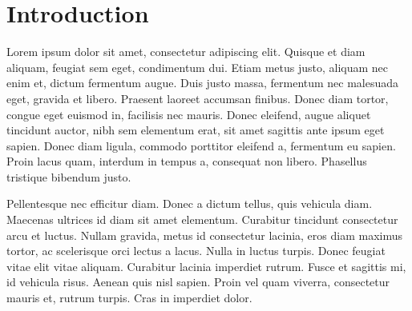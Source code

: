 %
%
%

\section{\label{sec:Introduction}Introduction}

Lorem ipsum dolor sit amet, consectetur adipiscing elit. Quisque et diam aliquam, feugiat sem eget, condimentum dui.
Etiam metus justo, aliquam nec enim et, dictum fermentum augue. Duis justo massa, fermentum nec malesuada eget, gravida
et libero. Praesent laoreet accumsan finibus. Donec diam tortor, congue eget euismod in, facilisis nec mauris. Donec
eleifend, augue aliquet tincidunt auctor, nibh sem elementum erat, sit amet sagittis ante ipsum eget sapien. Donec diam
ligula, commodo porttitor eleifend a, fermentum eu sapien. Proin lacus quam, interdum in tempus a, consequat non
libero. Phasellus tristique bibendum justo.

Pellentesque nec efficitur diam. Donec a dictum tellus, quis vehicula diam. Maecenas ultrices id diam sit amet
elementum. Curabitur tincidunt consectetur arcu et luctus. Nullam gravida, metus id consectetur lacinia, eros diam
maximus tortor, ac scelerisque orci lectus a lacus. Nulla in luctus turpis. Donec feugiat vitae elit vitae aliquam.
Curabitur lacinia imperdiet rutrum. Fusce et sagittis mi, id vehicula risus. Aenean quis nisl sapien. Proin vel quam
viverra, consectetur mauris et, rutrum turpis. Cras in imperdiet dolor.
